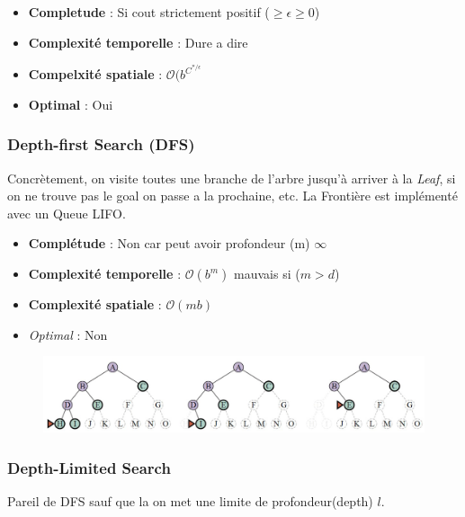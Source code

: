 			\begin{itemize}
				\item \textbf{Completude} : Si cout strictement positif ($\geq \epsilon \geq 0$)
				\item \textbf{Complexité temporelle} : Dure a dire
				\item \textbf{Compelxité spatiale} : $\mathcal{O}(b^{C^{*/\epsilon}}$
				\item \textbf{Optimal} : Oui
			\end{itemize}
			
			
			
		\subsubsection{Depth-first Search (DFS)}
		Concrètement, on visite toutes une branche de l'arbre jusqu'à arriver à la \textit{Leaf}, si on ne trouve pas le goal on passe a la prochaine, etc.
		La Frontière est implémenté avec un Queue LIFO.
		
		\begin{itemize}
			\item \textbf{Complétude} : Non car peut avoir profondeur (m) $\infty$
			\item \textbf{Complexité temporelle} : $\mathcal{O}(b^m)$ mauvais si ($m > d$)
			\item \textbf{Complexité spatiale} : $\mathcal{O}(mb)$
			\item \textit{Optimal} : Non
		\end{itemize}
		
		\begin{figure}[htp]
			\centering
			\includegraphics[width=\textwidth]{img/ExempleDFS.png}
		\end{figure}
		
		\subsubsection{Depth-Limited Search}
			Pareil de DFS sauf que la on met une limite de profondeur(depth) $l$.
		
